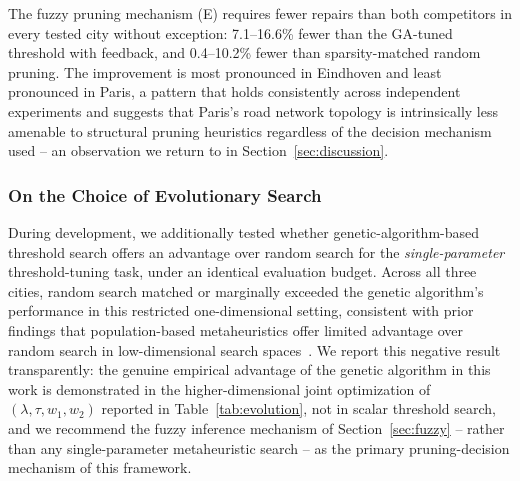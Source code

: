 The fuzzy pruning mechanism (E) requires fewer repairs than both competitors in every tested city without exception: 7.1--16.6\% fewer than the GA-tuned threshold with feedback, and 0.4--10.2\% fewer than sparsity-matched random pruning. The improvement is most pronounced in Eindhoven and least pronounced in Paris, a pattern that holds consistently across independent experiments and suggests that Paris's road network topology is intrinsically less amenable to structural pruning heuristics regardless of the decision mechanism used -- an observation we return to in Section~\ref{sec:discussion}.

\subsubsection{On the Choice of Evolutionary Search}
During development, we additionally tested whether genetic-algorithm-based threshold search offers an advantage over random search for the \emph{single-parameter} threshold-tuning task, under an identical evaluation budget. Across all three cities, random search matched or marginally exceeded the genetic algorithm's performance in this restricted one-dimensional setting, consistent with prior findings that population-based metaheuristics offer limited advantage over random search in low-dimensional search spaces~\cite{bergstra2012random}. We report this negative result transparently: the genuine empirical advantage of the genetic algorithm in this work is demonstrated in the higher-dimensional joint optimization of $(\lambda, \tau, w_1, w_2)$ reported in Table~\ref{tab:evolution}, not in scalar threshold search, and we recommend the fuzzy inference mechanism of Section~\ref{sec:fuzzy} -- rather than any single-parameter metaheuristic search -- as the primary pruning-decision mechanism of this framework.


